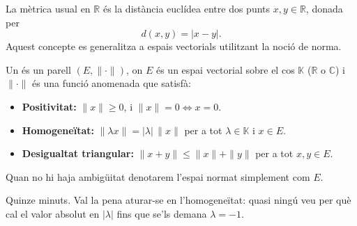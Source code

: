 
\begin{frame}

La mètrica usual en $\mathbb{R}$ és la distància euclídea entre dos punts
$x, y \in \mathbb{R}$, donada per
\[
  d(x,y) = |x-y|.
\]
Aquest concepte es generalitza a espais vectorials utilitzant la noció de norma.


\begin{definition}
Un  és un parell $(E, \|\cdot\|)$, on $E$ és un espai
vectorial sobre el cos $\mathbb{K}$ ($\mathbb{R}$ o $\mathbb{C}$) i
$\|\cdot\|$ és una funció anomenada  que satisfà:
\begin{itemize}
  \item \textbf{Positivitat:} $\|x\| \geq 0$, i $\|x\| = 0 \iff x = 0$.
  \item \textbf{Homogeneïtat:} $\|\lambda x\| = |\lambda|\,\|x\|$ per a tot
        $\lambda \in \mathbb{K}$ i $x \in E$.
  \item \textbf{Desigualtat triangular:} $\|x+y\| \leq \|x\| + \|y\|$ per a
        tot $x, y \in E$.
\end{itemize}
Quan no hi haja ambigüitat denotarem l'espai normat simplement com $E$.
\end{definition}

\begin{teaching}[Ritme]
Quinze minuts. Val la pena aturar-se en l'homogeneïtat: quasi ningú veu per què
cal el valor absolut en $|\lambda|$ fins que se'ls demana $\lambda = -1$.
\end{teaching}
\end{frame}

